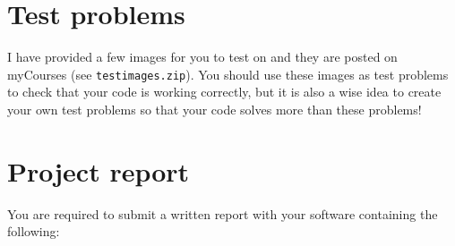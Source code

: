 \documentclass[12pt]{article}
\begin{document}
\section*{Test problems}

I have provided a few images for you to test on and they are posted on myCourses (see \texttt{testimages.zip}). You should use these images as test problems to check that your code is working correctly, but it is also a wise idea to create your own test problems so that your code solves more than these problems!

\newpage

\section*{Project report}

You are required to submit a written report with your software containing the following:
\end{document}
